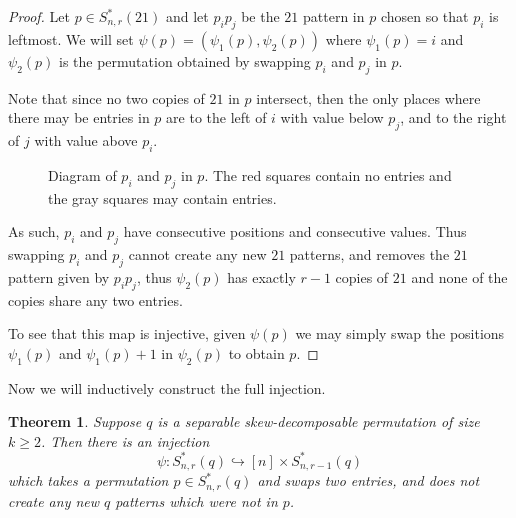 \documentclass[11pt, final]{amsart}
\newtheorem{theorem}{Theorem}[section]								\newtheorem{proposition}[theorem]{Proposition}
\theoremstyle{remark}
\numberwithin{equation}{section}
\begin{document}
\begin{proof}
    Let $p \in S_{n,r}^*(21)$ and let $p_ip_j$ be the $21$ pattern in $p$ chosen so that $p_i$ is leftmost. We will set $\psi(p) = (\psi_1(p), \psi_2(p))$ where $\psi_1(p) = i$ and $\psi_2(p)$ is the permutation obtained by swapping $p_i$ and $p_j$ in $p$.

    Note that since no two copies of $21$ in $p$ intersect, then the only places where there may be entries in $p$ are to the left of $i$ with value below $p_j$, and to the right of $j$ with value above $p_i$.

    \begin{figure}[H]
        \centering
        \caption{Diagram of $p_i$ and $p_j$ in $p$. The red squares contain no entries and the gray squares may contain entries.}
        \label{fig:placeholder}
    \end{figure}
    As such, $p_i$ and $p_j$ have consecutive positions and consecutive values. Thus swapping $p_i$ and $p_j$ cannot create any new $21$ patterns, and removes the $21$ pattern given by $p_ip_j$, thus $\psi_2(p)$ has exactly $r-1$ copies of $21$ and none of the copies share any two entries.

    To see that this map is injective, given $\psi(p)$ we may simply swap the positions $\psi_1(p)$ and $\psi_1(p) + 1$ in $\psi_2(p)$ to obtain $p$.
\end{proof}
Now we will inductively construct the full injection. 
\begin{theorem}
    Suppose $q$ is a separable skew-decomposable permutation of size $k\geq 2$. Then there is an injection
    \[
    \psi: S_{n,r}^*(q) \hookrightarrow [n] \times S^*_{n, r-1}(q)
    \]
    which takes a permutation $p \in S_{n,r}^*(q)$ and swaps two entries, and does not create any new $q$ patterns which were not in $p$.
\end{theorem}
\end{document}
